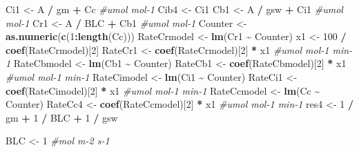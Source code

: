 \documentclass[
]{krantz}
\makeatletter
\newenvironment{Shaded}{\begin{snugshade}}{\end{snugshade}}
\newcommand{\CommentTok}[1]{\textcolor[rgb]{0.56,0.35,0.01}{\textit{#1}}}
\newcommand{\DecValTok}[1]{\textcolor[rgb]{0.00,0.00,0.81}{#1}}
\newcommand{\KeywordTok}[1]{\textcolor[rgb]{0.13,0.29,0.53}{\textbf{#1}}}
\newcommand{\NormalTok}[1]{#1}
\newcommand{\OperatorTok}[1]{\textcolor[rgb]{0.81,0.36,0.00}{\textbf{#1}}}
\newcommand{\StringTok}[1]{\textcolor[rgb]{0.31,0.60,0.02}{#1}}
\newenvironment{kframe}{%
\medskip{}
\setlength{\fboxsep}{.8em}
 \def\at@end@of@kframe{}%
 \ifinner\ifhmode%
  \def\at@end@of@kframe{\end{minipage}}%
  \begin{minipage}{\columnwidth}%
 \fi\fi%
 \def\FrameCommand##1{\hskip\@totalleftmargin \hskip-\fboxsep
 \colorbox{shadecolor}{##1}\hskip-\fboxsep
     \hskip-\linewidth \hskip-\@totalleftmargin \hskip\columnwidth}%
 \MakeFramed {\advance\hsize-\width
   \@totalleftmargin\z@ \linewidth\hsize
   \@setminipage}}%
 {\par\unskip\endMakeFramed%
 \at@end@of@kframe}
\renewenvironment{Shaded}{\begin{kframe}}{\end{kframe}}
\makeatother
\begin{document}
\begin{Shaded}
\begin{Highlighting}[]
\NormalTok{Ci1 \textless{}{-}}\StringTok{ }\NormalTok{A }\OperatorTok{/}\StringTok{ }\NormalTok{gm }\OperatorTok{+}\StringTok{ }\NormalTok{Cc }\CommentTok{\#umol mol{-}1}
\NormalTok{Cib4 \textless{}{-}}\StringTok{ }\NormalTok{Ci1}
\NormalTok{Cb1 \textless{}{-}}\StringTok{ }\NormalTok{A }\OperatorTok{/}\StringTok{ }\NormalTok{gsw }\OperatorTok{+}\StringTok{ }\NormalTok{Ci1 }\CommentTok{\#umol mol{-}1}
\NormalTok{Cr1 \textless{}{-}}\StringTok{ }\NormalTok{A }\OperatorTok{/}\StringTok{ }\NormalTok{BLC }\OperatorTok{+}\StringTok{ }\NormalTok{Cb1 }\CommentTok{\#umol mol{-}1}
\NormalTok{Counter \textless{}{-}}\StringTok{ }\KeywordTok{as.numeric}\NormalTok{(}\KeywordTok{c}\NormalTok{(}\DecValTok{1}\OperatorTok{:}\KeywordTok{length}\NormalTok{(Cc)))}
\NormalTok{RateCrmodel \textless{}{-}}\StringTok{ }\KeywordTok{lm}\NormalTok{(Cr1 }\OperatorTok{\textasciitilde{}}\StringTok{ }\NormalTok{Counter)}
\NormalTok{x1 \textless{}{-}}\StringTok{ }\DecValTok{100} \OperatorTok{/}\StringTok{ }\KeywordTok{coef}\NormalTok{(RateCrmodel)[}\DecValTok{2}\NormalTok{]}
\NormalTok{RateCr1 \textless{}{-}}\StringTok{ }\KeywordTok{coef}\NormalTok{(RateCrmodel)[}\DecValTok{2}\NormalTok{] }\OperatorTok{*}\StringTok{ }\NormalTok{x1 }\CommentTok{\#umol mol{-}1 min{-}1}
\NormalTok{RateCbmodel \textless{}{-}}\StringTok{ }\KeywordTok{lm}\NormalTok{(Cb1 }\OperatorTok{\textasciitilde{}}\StringTok{ }\NormalTok{Counter)}
\NormalTok{RateCb1 \textless{}{-}}\StringTok{ }\KeywordTok{coef}\NormalTok{(RateCbmodel)[}\DecValTok{2}\NormalTok{] }\OperatorTok{*}\StringTok{ }\NormalTok{x1 }\CommentTok{\#umol mol{-}1 min{-}1}
\NormalTok{RateCimodel \textless{}{-}}\StringTok{ }\KeywordTok{lm}\NormalTok{(Ci1 }\OperatorTok{\textasciitilde{}}\StringTok{ }\NormalTok{Counter)}
\NormalTok{RateCi1 \textless{}{-}}\StringTok{ }\KeywordTok{coef}\NormalTok{(RateCimodel)[}\DecValTok{2}\NormalTok{] }\OperatorTok{*}\StringTok{ }\NormalTok{x1 }\CommentTok{\#umol mol{-}1 min{-}1}
\NormalTok{RateCcmodel \textless{}{-}}\StringTok{ }\KeywordTok{lm}\NormalTok{(Cc }\OperatorTok{\textasciitilde{}}\StringTok{ }\NormalTok{Counter)}
\NormalTok{RateCc4 \textless{}{-}}\StringTok{ }\KeywordTok{coef}\NormalTok{(RateCcmodel)[}\DecValTok{2}\NormalTok{] }\OperatorTok{*}\StringTok{ }\NormalTok{x1 }\CommentTok{\#umol mol{-}1 min{-}1}
\NormalTok{res4 \textless{}{-}}\StringTok{ }\DecValTok{1} \OperatorTok{/}\StringTok{ }\NormalTok{gm }\OperatorTok{+}\StringTok{ }\DecValTok{1} \OperatorTok{/}\StringTok{ }\NormalTok{BLC }\OperatorTok{+}\StringTok{ }\DecValTok{1} \OperatorTok{/}\StringTok{ }\NormalTok{gsw}

\NormalTok{BLC \textless{}{-}}\StringTok{ }\DecValTok{1} \CommentTok{\#mol m{-}2 s{-}1}


\end{Highlighting}
\end{Shaded}
\end{document}

